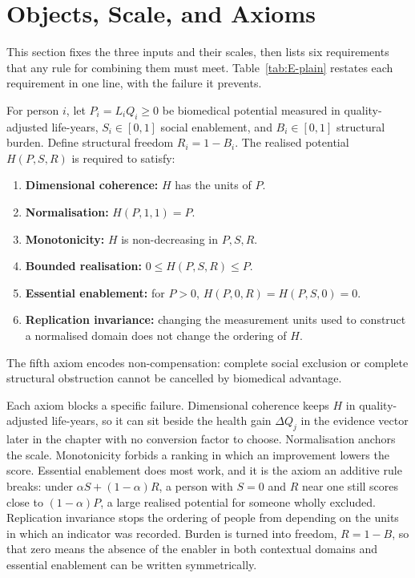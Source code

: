 \section{Objects, Scale, and Axioms}
\label{sec:E-axioms}
This section fixes the three inputs and their scales, then lists six
requirements that any rule for combining them must meet. Table~\ref{tab:E-plain}
restates each requirement in one line, with the failure it prevents.

For person $i$, let $P_i=L_iQ_i\geq0$ be biomedical potential measured in
quality-adjusted life-years, $S_i\in[0,1]$ social enablement, and
$B_i\in[0,1]$ structural burden. Define structural freedom $R_i=1-B_i$.
The realised potential $H(P,S,R)$ is required to satisfy:
\begin{enumerate}
 \item \textbf{Dimensional coherence:} $H$ has the units of $P$.
 \item \textbf{Normalisation:} $H(P,1,1)=P$.
 \item \textbf{Monotonicity:} $H$ is non-decreasing in $P,S,R$.
 \item \textbf{Bounded realisation:} $0\leq H(P,S,R)\leq P$.
 \item \textbf{Essential enablement:} for $P>0$, $H(P,0,R)=H(P,S,0)=0$.
 \item \textbf{Replication invariance:} changing the measurement units used
 to construct a normalised domain does not change the ordering of $H$.
\end{enumerate}
The fifth axiom encodes non-compensation: complete social exclusion or complete
structural obstruction cannot be cancelled by biomedical advantage.

Each axiom blocks a specific failure. Dimensional coherence keeps $H$ in
quality-adjusted life-years, so it can sit beside the health gain $\Delta Q_j$
in the evidence vector later in the chapter with no conversion factor to
choose. Normalisation anchors the scale. Monotonicity forbids a ranking in which
an improvement lowers the score. Essential enablement does most work, and it is
the axiom an additive rule breaks: under $\alpha S+(1-\alpha)R$, a person with
$S=0$ and $R$ near one still scores close to $(1-\alpha)P$, a large realised
potential for someone wholly excluded. Replication invariance stops the
ordering of people from depending on the units in which an indicator was
recorded. Burden is turned into freedom, $R=1-B$, so that zero means the
absence of the enabler in both contextual domains and essential enablement can
be written symmetrically.

